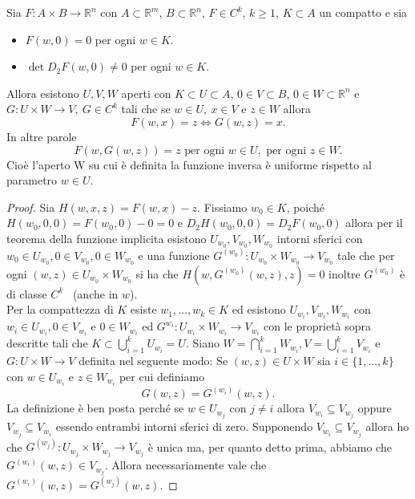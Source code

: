 \begin{teorema}
Sia $F:A\times B\rightarrow\mathbb{R}^{n}$ con $A\subset\mathbb{R}^{m}$, $B\subset\mathbb{R}^{n}$, $F\in C^{k}$, $k\geq 1$, $K\subset A$ un compatto e sia
\begin{itemize}
\item $F(w,0) = 0$ per ogni $w \in K$.
\item $\det D_{2}F(w,0)\neq0$ per ogni $w\in K$.
\end{itemize}
Allora esistono $U, V, W$ aperti con $K\subset U\subset A$, $0\in V\subset B$, $0\in W\subset\mathbb{R}^{n}$ e $G\colon U\times W\rightarrow V, \ G\in C^{k}$ tali che se $w\in U, \ x\in V$ e $z\in W$ allora
\begin{equation}
F(w,x)=z \Longleftrightarrow G(w,z)=x.
\end{equation}
In altre parole
\begin{equation}
F(w,G(w,z))=z \text{ \ per ogni \ } w\in U, \text{ \ per ogni \ } z\in W.
\end{equation}
Cioè l'aperto W su cui è definita la funzione inversa è uniforme rispetto al parametro $w\in U$.
\end{teorema}
\begin{proof}
Sia $H(w,x,z)=F(w,x)-z$. Fissiamo $w_{0}\in K$, poiché $H(w_{0},0,0)=F(w_{0},0)-0=0$ e $D_{2}H(w_{0},0,0)=D_{2}F(w_{0},0)$ allora per il teorema della funzione implicita esistono $U_{w_{0}}, V_{w_{0}}, W_{w_{0}}$ intorni sferici con $w_{0}\in U_{w_{0}}, 0\in V_{w_{0}}, 0\in W_{w_{0}}$ e una funzione $G^{(w_{0})}\colon U_{w_{0}}\times W_{w_{0}}\rightarrow V_{w_{0}}$ tale che per ogni $(w,z)\in U_{w_{0}}\times W_{w_{0}}$ si ha che $H(w,G^{(w_{0})}(w,z),z)=0$ inoltre $G^{(w_{0})}$ è di classe $C^{k}$ \ (anche in $w$). \\
Per la compattezza di $K$ esiste $w_{1}, \ldots, w_{k}\in K$ ed esistono $U_{w_{i}}, V_{w_{i}}, W_{w_{i}}$ con $w_{i}\in U_{w_{i}}, 0\in V_{w_{i}}$ e $0\in W_{w_{i}}$ ed $G^{w_{i}}\colon U_{w_{i}}\times W_{w_{i}}\rightarrow V_{w_{i}}$ con le proprietà sopra descritte tali che $K\subset\bigcup_{i=1}^{k}U_{w_{i}} = U$.
Siano $W = \bigcap_{i = 1}^{k}W_{w_{i}}, V = \bigcup_{i=1}^{k}V_{w_{i}}$ e $G: U\times W \rightarrow V$ definita nel seguente modo: Se $(w,z)\in U\times W$ sia $i\in\{1,...,k\}$ con $w\in U_{w_{i}}$ e $z\in W_{w_{i}}$ per cui definiamo
\begin{equation*}
G(w,z) = G^{(w_{i})}(w,z).
\end{equation*}
La definizione è ben posta perché se $w\in U_{w_{j}}$ con $j\neq i$ allora $V_{w_{i}}\subseteq V_{w_{j}}$ oppure $V_{w_{j}}\subseteq V_{w_{i}}$ essendo entrambi intorni sferici di zero. Supponendo $V_{w_{i}}\subseteq V_{w_{j}}$ allora ho che $G^{(w_{j})}:U_{w_{j}}\times W_{w_{j}}\rightarrow V_{w_{j}}$ è unica ma, per quanto detto prima, abbiamo che $G^{(w_{i})}(w,z)\in V_{w_{j}}$. Allora necessariamente vale che $G^{(w_{i})}(w,z) = G^{(w_{j})}(w,z)$.
\end{proof}

